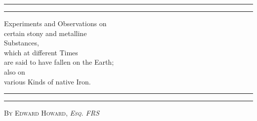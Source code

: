 \documentclass[a4paper, 12pt, oneside, twocolumn]{article}
\begin{document}
\begin{titlepage} %
	\centering %
	\scshape %

	
	\rule{\textwidth}{1.6pt}\vspace*{-\baselineskip}\vspace*{2pt} %
	\rule{\textwidth}{0.4pt} %
	
	\vspace{0.75\baselineskip} %

        {\LARGE Experiments and Observations on\\ certain stony and metalline\\ Substances,\\ which at different Times\\ are said to have fallen on the Earth;\\ also on\\ various Kinds of native Iron.} %
	
	\vspace{0.75\baselineskip} %
	
	\rule{\textwidth}{0.4pt}\vspace*{-\baselineskip}\vspace{3.2pt} %
	\rule{\textwidth}{1.6pt} %
	
	\vspace{1\baselineskip} %
	
	
	{\scshape\Large By Edward Howard, \emph{Esq. FRS}} %
	
	\vspace*{1\baselineskip} %
	

	\vspace{1\baselineskip} %

	

\end{titlepage}
\end{document}
